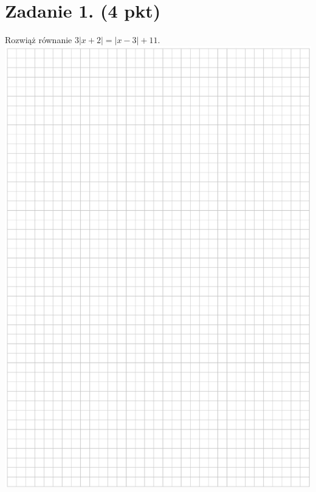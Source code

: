 \documentclass[10pt]{article}
\begin{document}
\section*{Zadanie 1. (4 pkt)}
Rozwiąż równanie \(3|x+2|=|x-3|+11\).\\
\includegraphics[max width=\textwidth, center]{2024_11_21_7379bf55d75dd0fc4c58g-02}\\
\end{document}
